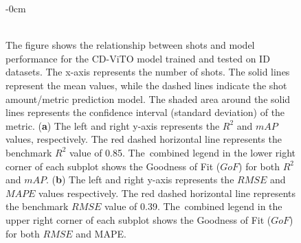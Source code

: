 \documentclass[12pt,a4paper,oneside]{report}
\newlength{\extralength}
\begin{document}
\begin{figure}[H]
 
  \begin{adjustwidth}{-\extralength}{0cm}
   \centering
  \\
  \\
  \end{adjustwidth}
  \caption{The figure shows the relationship between shots and model performance
  for the CD-ViTO model trained and tested on ID datasets.
  The x-axis represents the number of shots.  The solid lines represent the mean values, while the dashed lines indicate the shot amount/metric 
  prediction model. The shaded area around the solid lines represents the confidence interval (standard deviation) of the metric.
  (\textbf{a}) The left and right y-axis represents the $R^2$ and $mAP$ values, respectively.
  The red dashed horizontal line represents the benchmark $R^2$ value of 0.85. The~combined
  legend in the lower right corner of each subplot shows the Goodness of Fit ($GoF$) for both $R^2$
  and $mAP$.
  (\textbf{b}) The left and right y-axis represents the $RMSE$ and $MAPE$ values respectively.
  The red dashed horizontal line represents the benchmark $RMSE$ value of 0.39. The~combined
  legend in the upper right corner of each subplot shows the Goodness of Fit ($GoF$) for both $RMSE$
  and MAPE.}
  \label{fig:shots_vs_performance}

\end{figure}


\vspace{-21pt}
\end{document}

